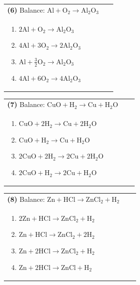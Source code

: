 \documentclass{article}
\begin{document}
\vspace{0.2cm}
\noindent \begin{tabular}{|p{0.9\linewidth}|}
\hline
\vspace{0.2cm}
\textbf{(6)} Balance: \(\mathrm{Al + O_2 \rightarrow Al_2O_3}\)\\
\begin{minipage}[t]{0.85\linewidth}
\begin{enumerate}[label=\alph*.]
   \item \(\mathrm{2Al + O_2 \rightarrow Al_2O_3}\)
   \item \(\mathrm{4Al + 3O_2 \rightarrow 2Al_2O_3}\)
   \item \(\mathrm{Al + \tfrac{3}{2}O_2 \rightarrow Al_2O_3}\)
   \item \(\mathrm{4Al + 6O_2 \rightarrow 4Al_2O_3}\)
\end{enumerate}
\end{minipage}\\
\hline
\end{tabular}

\vspace{0.2cm}
\noindent \begin{tabular}{|p{0.9\linewidth}|}
\hline
\vspace{0.2cm}
\textbf{(7)} Balance: \(\mathrm{CuO + H_2 \rightarrow Cu + H_2O}\)\\
\begin{minipage}[t]{0.85\linewidth}
\begin{enumerate}[label=\alph*.]
   \item \(\mathrm{CuO + 2H_2 \rightarrow Cu + 2H_2O}\)
   \item \(\mathrm{CuO + H_2 \rightarrow Cu + H_2O}\)
   \item \(\mathrm{2CuO + 2H_2 \rightarrow 2Cu + 2H_2O}\)
   \item \(\mathrm{2CuO + H_2 \rightarrow 2Cu + H_2O}\)
\end{enumerate}
\end{minipage}\\
\hline
\end{tabular}

\vspace{0.2cm}
\noindent \begin{tabular}{|p{0.9\linewidth}|}
\hline
\vspace{0.2cm}
\textbf{(8)} Balance: \(\mathrm{Zn + HCl \rightarrow ZnCl_2 + H_2}\)\\
\begin{minipage}[t]{0.85\linewidth}
\begin{enumerate}[label=\alph*.]
   \item \(\mathrm{2Zn + HCl \rightarrow ZnCl_2 + H_2}\)
   \item \(\mathrm{Zn + HCl \rightarrow ZnCl_2 + 2H_2}\)
   \item \(\mathrm{Zn + 2HCl \rightarrow ZnCl_2 + H_2}\)
   \item \(\mathrm{Zn + 2HCl \rightarrow ZnCl + H_2}\)
\end{enumerate}
\end{minipage}\\
\hline
\end{tabular}
\newpage
\end{document}
